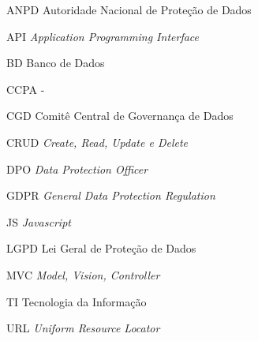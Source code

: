 \documentclass[
	12pt,				%
	openright,			%
	oneside,			%
	a4paper,			%
	english,			%
	french,				%
	spanish,			%
	brazil,				%
	]{abntex2}
\begin{document}
\listoffigures*
\cleardoublepage

\listoftables*
\cleardoublepage

\begin{siglas}
    \item[ANPD] Autoridade Nacional de Proteção de Dados
    \item[API] \textit{Application Programming Interface}
    \item[BD] Banco de Dados
    \item[CCPA] -
    \item[CGD] Comitê Central de Governança de Dados
    \item[CRUD] \textit{Create, Read, Update e Delete}
    \item[DPO] \textit{Data Protection Officer}
    \item[GDPR] \textit{ General Data Protection Regulation}
    \item [JS] \textit{Javascript}
    \item[LGPD] Lei Geral de Proteção de Dados
    \item[MVC] \textit{Model, Vision, Controller}
    \item[TI] Tecnologia da Informação
    \item[URL] \textit{Uniform Resource Locator}
\end{siglas}


\tableofcontents*



\textual
\setcounter{page}{1}
\end{document}

